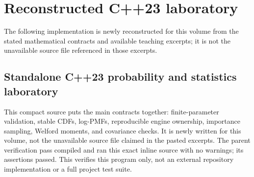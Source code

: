 \section{Reconstructed C++23 laboratory}\label{02-foundations-ii-ch038-reconstructed-c23-laboratory}

\hypertarget{02-foundations-ii-ch038-reconstructed-c23-laboratory}{}

The following implementation is newly reconstructed for this volume from the stated mathematical contracts and available teaching excerpts; it is not the unavailable source file referenced in those excerpts.

\subsection{Standalone C++23 probability and statistics laboratory}\label{02-foundations-ii-ch038-standalone-c23-probability-and-statistics-laboratory}

\hypertarget{02-foundations-ii-ch038-standalone-c23-probability-and-statistics-laboratory}{}

This compact source puts the main contracts together: finite-parameter validation, stable CDFs, log-PMFs, reproducible engine ownership, importance sampling, Welford moments, and covariance checks. It is newly written for this volume, not the unavailable source file claimed in the pasted excerpts. The parent verification pass compiled and ran this exact inline source with no warnings; its assertions passed. This verifies this program only, not an external repository implementation or a full project test suite.

